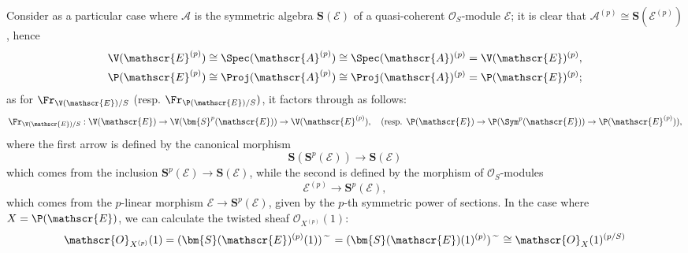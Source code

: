 Consider as a particular case where $\mathscr{A}$ is the symmetric algebra $\bm{S}(\mathscr{E})$ of a quasi-coherent $\mathscr{O}_S$-module $\mathscr{E}$; it is clear that $\mathscr{A}^{(p)}\cong\bm{S}(\mathscr{E}^{(p)})$, hence
\begin{gather*}
\V(\mathscr{E}^{(p)})\cong\Spec(\mathscr{A}^{(p)})\cong\Spec(\mathscr{A})^{(p)}=\V(\mathscr{E})^{(p)},\\
\P(\mathscr{E}^{(p)})\cong\Proj(\mathscr{A}^{(p)})\cong\Proj(\mathscr{A})^{(p)}=\P(\mathscr{E})^{(p)};
\end{gather*}
as for $\Fr_{\V(\mathscr{E})/S}$ (resp. $\Fr_{\P(\mathscr{E})/S})$, it factors through as follows:
\[\Fr_{\V(\mathscr{E})/S}:\V(\mathscr{E})\to\V(\bm{S}^p(\mathscr{E}))\to\V(\mathscr{E}^{(p)}),\quad (\text{resp. }\P(\mathscr{E})\to\P(\Sym^p(\mathscr{E}))\to\P(\mathscr{E}^{(p)})),\]
where the first arrow is defined by the canonical morphism 
\[\bm{S}(\bm{S}^p(\mathscr{E}))\to\bm{S}(\mathscr{E})\]
which comes from the inclusion $\bm{S}^p(\mathscr{E})\to\bm{S}(\mathscr{E})$, while the second is defined by the morphism of $\mathscr{O}_S$-modules
\[\mathscr{E}^{(p)}\to\bm{S}^p(\mathscr{E}),\]
which comes from the $p$-linear morphism $\mathscr{E}\to\bm{S}^p(\mathscr{E})$, given by the $p$-th symmetric power of sections. In the case where $X=\P(\mathscr{E})$, we can calculate the twisted sheaf $\mathscr{O}_{X^{(p)}}(1)$:
\[\mathscr{O}_{X^{(p)}}(1)=(\bm{S}(\mathscr{E})^{(p)}(1))\widetilde{\hspace{3mm}}=(\bm{S}(\mathscr{E})(1)^{(p)})\widetilde{\hspace{3mm}}\cong\mathscr{O}_{X}(1)^{(p/S)}\]

